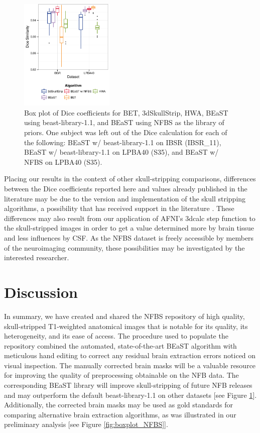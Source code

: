 \begin{figure}[ht!]
\includegraphics[width=0.4\textwidth]{boxplot_IL.pdf}
    \caption{
Box plot of Dice coefficients for BET, 3dSkullStrip, HWA, BEaST using beast-library-1.1, and BEaST using NFBS as the library of priors. One subject was left out of the Dice calculation for each of the following: BEaST w/ beast-library-1.1 on IBSR (IBSR\_11), BEaST w/ beast-library-1.1 on LPBA40 (S35), and BEaST w/ NFBS on LPBA40 (S35).}
\label{fig:boxplot_I&L}
\end{figure}

Placing our results in the context of other skull-stripping comparisons, differences between the Dice coefficients reported here and values already published in the literature may be due to the version and implementation of the skull stripping algorithms, a possibility that has received support in the literature \cite{Iglesias2011}. These differences may also result from our application of AFNI's 3dcalc step function to the skull-stripped images in order to get a value determined more by brain tissue and less influences by CSF. As the NFBS dataset is freely accessible by members of the neuroimaging community, these possibilities may be investigated by the interested researcher.

\section*{Discussion}
In summary, we have created and shared the NFBS repository of high quality, skull-stripped T1-weighted anatomical images that is notable for its quality, its heterogeneity, and its ease of access. The procedure used to populate the repository combined the automated, state-of-the-art BEaST algorithm with  meticulous hand editing to correct any residual brain extraction errors noticed on visual inspection. The manually corrected brain masks will be a valuable resource for improving the quality of preprocessing obtainable on the NFB data. The corresponding BEaST library will improve skull-stripping of future NFB releases and may outperform the default beast-library-1.1 on other datasets [see Figure \ref{fig:boxplot_I&L}]. Additionally, the corrected brain masks may be used as gold standards for comparing alternative brain extraction algorithms, as was illustrated in our preliminary analysis [see Figure \ref{fig:boxplot_NFBS}].

